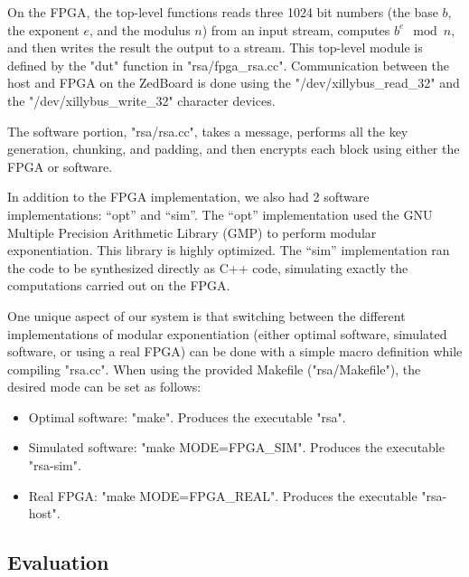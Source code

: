 On the FPGA, the top-level functions reads three 1024 bit numbers (the base $b$, the exponent $e$, and the modulus $n$) from
an input stream, computes $b^e \mod n$, and then writes the result the output to a stream.
This top-level module is defined by the "dut" function in "rsa/fpga_rsa.cc".
Communication between the host and FPGA on the ZedBoard is done using the "/dev/xillybus_read_32" and the "/dev/xillybus_write_32"
character devices.

The software portion, "rsa/rsa.cc", takes a message, performs all the key generation, chunking, and padding, and then encrypts
each block using either the FPGA or software.

In addition to the FPGA implementation, we also had 2 software implementations: ``opt'' and ``sim''. The ``opt'' implementation
used the GNU Multiple Precision Arithmetic Library (GMP) to perform modular exponentiation. This library is highly 
optimized. The ``sim'' implementation ran the code to be synthesized directly as C++ code, simulating exactly the computations
carried out on the FPGA.

One unique aspect of our system is that switching between the different implementations of modular exponentiation (either optimal
software, simulated software, or using a real FPGA) can be done with a simple macro definition while compiling "rsa.cc".
When using the provided Makefile ("rsa/Makefile"), the desired mode can be set as follows:
\begin{itemize}
\item Optimal software: "make". Produces the executable "rsa".
\item Simulated software: "make MODE=FPGA_SIM". Produces the executable "rsa-sim".
\item Real FPGA: "make MODE=FPGA_REAL". Produces the executable "rsa-host".
\end{itemize}

\subsection{Evaluation}

